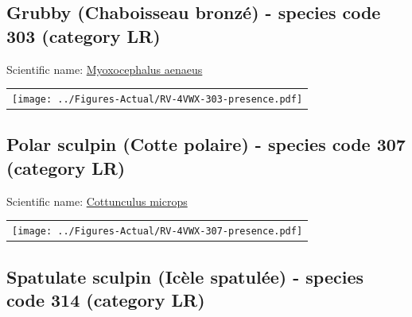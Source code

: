 \documentclass[12pt]{article}\usepackage[]{graphicx}\usepackage[]{color}
\begin{document}
\hypertarget{sec:303}{%
\subsection{Grubby (Chaboisseau bronzé) - species code 303 (category LR)}\label{sec:303}}

  


Scientific name: \href{http://www.marinespecies.org/aphia.php?p=taxdetails\&id=159519}{Myoxocephalus aenaeus} \newline
\begin{minipage}{1.0\textwidth}
 \begin{tabular}{c}
\texttt{[image: ../Figures-Actual/RV-4VWX-303-presence.pdf]} \\ 
\end{tabular} 
\end{minipage}
\clearpage

\renewcommand\thefigure{\thesubsection\Alph{figure}}

\setcounter{figure}{0}

\hypertarget{sec:307}{%
\subsection{Polar sculpin (Cotte polaire) - species code 307 (category LR)}\label{sec:307}}

  


Scientific name: \href{http://www.marinespecies.org/aphia.php?p=taxdetails\&id=127235}{Cottunculus microps} \newline
\begin{minipage}{1.0\textwidth}
 \begin{tabular}{c}
\texttt{[image: ../Figures-Actual/RV-4VWX-307-presence.pdf]} \\ 
\end{tabular} 
\end{minipage}
\clearpage

\renewcommand\thefigure{\thesubsection\Alph{figure}}

\setcounter{figure}{0}

\hypertarget{sec:314}{%
\subsection{Spatulate sculpin (Icèle spatulée) - species code 314 (category LR)}\label{sec:314}}
\end{document}
